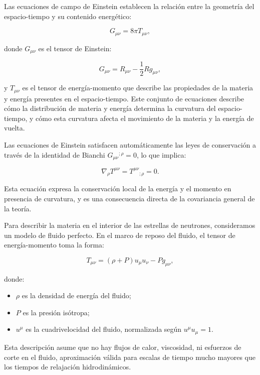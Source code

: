 Las ecuaciones de campo de Einstein establecen la relación entre la geometría del espacio-tiempo y su contenido energético:

\begin{equation}
	G_{\mu\nu} = 8\pi T_{\mu\nu},
	\label{eq:einstein_field}
\end{equation}

donde $G_{\mu\nu}$ es el tensor de Einstein:

\begin{equation}
	G_{\mu\nu} = R_{\mu\nu} - \frac{1}{2}Rg_{\mu\nu},
\end{equation}

y $T_{\mu\nu}$ es el tensor de energía-momento que describe las propiedades de la materia y energía presentes en el espacio-tiempo. Este conjunto de ecuaciones describe cómo la distribución de materia y energía determina la curvatura del espacio-tiempo, y cómo esta curvatura afecta el movimiento de la materia y la energía de vuelta.

Las ecuaciones de Einstein satisfacen automáticamente las leyes de conservación a través de la identidad de Bianchi $G_{\mu\nu}{}^{;\rho} = 0$, lo que implica:

\begin{equation}
	\nabla_\rho T^{\mu\nu} = T^{\mu\nu}{}_{;\rho} = 0.
\end{equation}

Esta ecuación expresa la conservación local de la energía y el momento en presencia de curvatura, y es una consecuencia directa de la covariancia general de la teoría.

Para describir la materia en el interior de las estrellas de neutrones, consideramos un modelo de fluido perfecto. En el marco de reposo del fluido, el tensor de energía-momento toma la forma:

\begin{equation}
	T_{\mu\nu} = (\rho + P)u_\mu u_\nu - Pg_{\mu\nu},
	\label{eq:tensor_fluido_perfecto}
\end{equation}

donde:
\begin{itemize}
	\item $\rho$ es la densidad de energía del fluido;
	\item $P$ es la presión isótropa;
	\item $u^\mu$ es la cuadrivelocidad del fluido, normalizada según $u^\mu u_\mu = 1$.
\end{itemize}

Esta descripción asume que no hay flujos de calor, viscosidad, ni esfuerzos de corte en el fluido, aproximación válida para escalas de tiempo mucho mayores que los tiempos de relajación hidrodinámicos.

